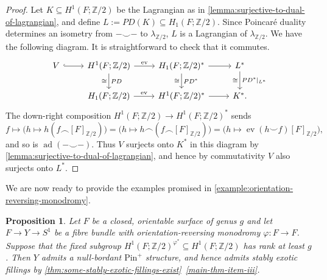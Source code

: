 \documentclass[a4paper, reqno]{amsart}
\newtheorem{proposition}{Proposition}[section]
\theoremstyle{definition}
\theoremstyle{remark}
\newcommand{\Z}{\mathbb{Z}}
\newcommand{\pinplus}{{\mathrm{Pin}^+}\!}
\DeclareMathOperator{\ev}{ev}
\begin{document}
\begin{proof}
Let $K \subseteq H^1(F;\Z/2)$ be the Lagrangian as in \cref{lemma:surjective-to-dual-of-lagrangian}, and define $L := PD(K) \subseteq H_1(F;\Z/2)$. Since Poincar\'{e} duality determines an isometry from $-\smile -$ to $\lambda_{\Z/2}$, $L$ is a Lagrangian of $\lambda_{\Z/2}$. We have the following diagram. It is straightforward to check that it commutes. 
\[\begin{tikzcd}
    V \ar[r,hook] & H^1(F;\Z/2) \ar[r,"\ev"] \ar[d,"PD","\cong"']  & H_1(F;\Z/2)^*  \ar[d,"PD^*","\cong"'] \ar[r] & L^* \ar[d,"PD^*|_{L^*}","\cong"']  \\
& H_1(F;\Z/2) \ar[r,"\ev"] & H^1(F;\Z/2)^* \ar[r] & K^*.
\end{tikzcd}\]
The down-right composition $H^1(F;\Z/2) \to H^1(F;\Z/2)^*$ sends \[f \mapsto  \big(h \mapsto h(f \frown [F]_{\Z/2})\big) = \big(h \mapsto h \frown (f \frown [F]_{\Z/2})\big) = \big(h \mapsto \ev(h \smile f)[F]_{\Z/2}\big),\]
and so is $\operatorname{ad}(- \smile -)$. Thus $V$ surjects onto $K^*$ in this diagram by \cref{lemma:surjective-to-dual-of-lagrangian}, and hence by commutativity $V$ also surjects onto $L^*$. 
\end{proof}

We are now ready to provide the examples promised in \cref{example:orientation-reversing-monodromy}.

 \begin{proposition}\label{prop:lagrangian-fixed-point-stable-filling}
    Let $F$ be a closed, orientable surface of genus $g$ and let $F \to Y \to S^1$ be a fibre bundle with orientation-reversing monodromy $\varphi \colon F \to F$. Suppose that the fixed subgroup $H^1(F;\Z/2)^{\varphi^*} \subseteq H^1(F;\Z/2)$ has rank at least $g$. 
    Then $Y$ admits a null-bordant $\pinplus$ structure, and hence admits stably exotic fillings by \cref{thm:some-stably-exotic-fillings-exist}~\eqref{main-thm-item-iii}.
 \end{proposition}
\end{document}
